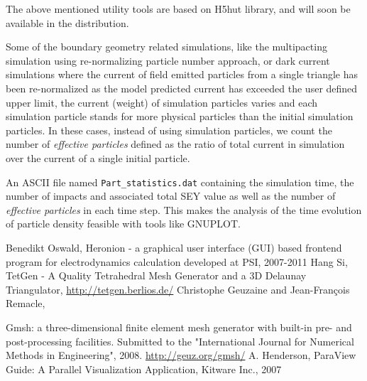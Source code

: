 \documentclass[a4paper,11pt]{article}
\begin{document}
The above mentioned utility tools are based on H5hut library, and will soon be available in the distribution.

Some of the boundary geometry related simulations, like the multipacting simulation using re-normalizing particle number approach, or dark current simulations where the current of field emitted particles from a single triangle has been re-normalized as the model predicted current has exceeded the user defined upper limit, the current (weight) of simulation particles varies and each simulation particle stands for more physical particles than the initial simulation particles. In these cases, instead of using simulation particles, we count the number of {\em effective particles} defined as the ratio of total current in simulation over the current of a single initial particle.

An ASCII file named {\tt Part\_statistics.dat} containing the simulation time, the number of impacts and associated total SEY value as well as the number of {\em effective particles} in each time step. This makes the analysis of the time evolution of particle density feasible with  tools like GNUPLOT. 
\begin{thebibliography}{99}
 Benedikt Oswald, Heronion - a graphical user interface (GUI) based frontend program for electrodynamics calculation developed at PSI, 2007-2011
 Hang Si, TetGen - A Quality Tetrahedral Mesh Generator and a 3D Delaunay Triangulator, \url{http://tetgen.berlios.de/} 
 Christophe Geuzaine and Jean-Fran{\c c}ois Remacle,

Gmsh: a three-dimensional finite element mesh generator with built-in
  pre- and post-processing facilities. Submitted to the "International Journal for Numerical Methods in 
Engineering", 2008. \url{http://geuz.org/gmsh/}
 A. Henderson, ParaView Guide: A Parallel Visualization Application, Kitware Inc., 2007  
\end{thebibliography} 
\end{document}
